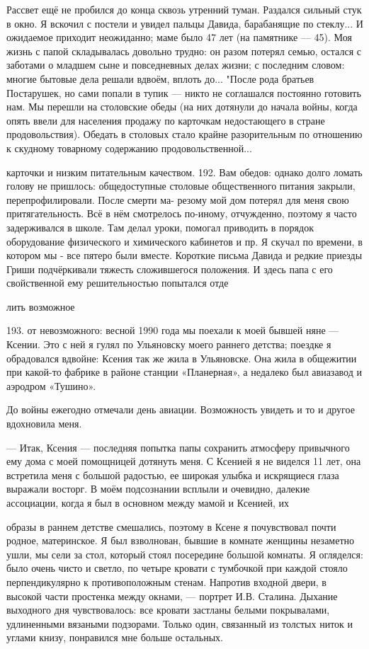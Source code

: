 Рассвет ещё не пробился до конца сквозь утренний туман. Раздался сильный стук в окно. Я вскочил с постели и увидел пальцы Давида, барабанящие по стеклу... И ожидаемое приходит неожиданно; маме было 47 лет (на памятнике — 45). Моя жизнь с папой складывалась довольно трудно: он разом потерял семью, остался с заботами о младшем сыне и повседневных делах жизни; с последним словом: многие бытовые дела решали вдвоём, вплоть до... "После рода братьев Постарушек, но сами попали в тупик — никто не соглашался постоянно готовить нам. Мы перешли на столовские обеды (на них дотянули до начала войны, когда опять ввели для населения продажу по карточкам недостающего в стране продовольствия). Обедать в столовых стало крайне разорительным по отношению к скудному товарному содержанию продовольственной...

карточки и низким питательным качеством. 192. Вам обедов: однако долго ломать голову не пришлось: общедоступные столовые общественного питания закрыли, перепрофилировали. После смерти ма- резому мой дом потерял для меня свою притягательность. Всё в нём смотрелось по-иному, отчужденно, поэтому я часто задерживался в школе. Там делал уроки, помогал приводить в порядок оборудование физического и химического кабинетов и пр. Я скучал по времени, в котором мы - все пятеро были вместе. Короткие письма Давида и редкие приезды Гриши подчёркивали тяжесть сложившегося положения. И здесь папа с его свойственной ему решительностью попытался отде

лить возможное

193. от невозможного: весной 1990 года мы поехали к моей бывшей няне — Ксении. Это с ней я гулял по Ульяновску моего раннего детства; поездке я обрадовался вдвойне: Ксения так же жила в Ульяновске. Она жила в общежитии при какой-то фабрике в районе станции «Планерная», а недалеко был авиазавод и аэродром «Тушино».

До войны ежегодно отмечали день авиации. Возможность увидеть и то и другое вдохновила меня.

— Итак, Ксения — последняя попытка папы сохранить атмосферу привычного ему дома с моей помощницей дотянуть меня. С Ксенией я не виделся 11 лет, она встретила меня с большой радостью, ее широкая улыбка и искрящиеся глаза выражали восторг. В моём подсознании всплыли и очевидно, далекие ассоциации, когда я был в основном между мамой и Ксенией, их

образы в раннем детстве смешались, поэтому в Ксене я почувствовал почти родное, материнское. Я был взволнован, бывшие в комнате женщины незаметно ушли, мы сели за стол, который стоял посередине большой комнаты. Я огляделся: было очень чисто и светло, по четыре кровати с тумбочкой при каждой стояло перпендикулярно к противоположным стенам. Напротив входной двери, в высокой части простенка между окнами, — портрет И.В. Сталина. Дыхание выходного дня чувствовалось: все кровати застланы белыми покрывалами, удлиненными вязаными подзорами. Только один, связанный из толстых ниток и углами книзу, понравился мне больше остальных.

